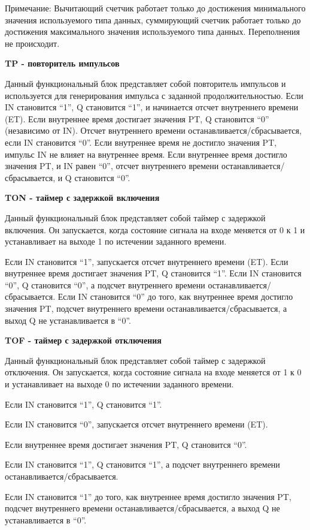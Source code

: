 \documentclass[letterpaper,10pt,russian]{sphinxmanual}
\begin{document}
Примечание: Вычитающий счетчик работает только до достижения
минимального значения используемого типа данных, суммирующий счетчик
работает только до достижения максимального значения используемого типа
данных. Переполнения не происходит.

\textbf{TP - повторитель импульсов}

Данный функциональный блок представляет собой повторитель импульсов и
используется для генерирования импульса с заданной продолжительностью.
Если IN становится ``1'', Q становится ``1'', и начинается отсчет
внутреннего времени (ET). Если внутреннее время достигает значения PT, Q
становится ``0'' (независимо от IN). Отсчет внутреннего времени
останавливается/сбрасывается, если IN становится ``0''. Если внутреннее
время не достигло значения PT, импульс IN не влияет на внутреннее время.
Если внутреннее время достигло значения PT, и IN равен ``0'', отсчет
внутреннего времени останавливается/сбрасывается, и Q становится ``0''.

\textbf{TON - таймер с задержкой включения}

Данный функциональный блок представляет собой таймер с задержкой
включения. Он запускается, когда состояние сигнала на входе меняется от
0 к 1 и устанавливает на выходе 1 по истечении заданного времени.

Если IN становится ``1'', запускается отсчет внутреннего времени (ET).
Если внутреннее время достигает значения PT, Q становится ``1''. Если IN
становится ``0'', Q становится ``0'', а подсчет внутреннего времени
останавливается/сбрасывается. Если IN становится ``0'' до того, как
внутреннее время достигло значения PT, подсчет внутреннего времени
останавливается/сбрасывается, а выход Q не устанавливается в ``0''.

\textbf{TOF - таймер с задержкой отключения}

Данный функциональный блок представляет собой таймер с задержкой
отключения. Он запускается, когда состояние сигнала на входе меняется от
1 к 0 и устанавливает на выходе 0 по истечении заданного времени.

Если IN становится ``1'', Q становится ``1''.

Если IN становится ``0'', запускается отсчет внутреннего времени (ET).

Если внутреннее время достигает значения PT, Q становится ``0''.

Если IN становится ``1'', Q становится ``1'', а подсчет внутреннего времени
останавливается/сбрасывается.

Если IN становится ``1'' до того, как внутреннее время достигло значения
PT, подсчет внутреннего времени останавливается/сбрасывается, а выход Q
не устанавливается в ``0''.
\end{document}
